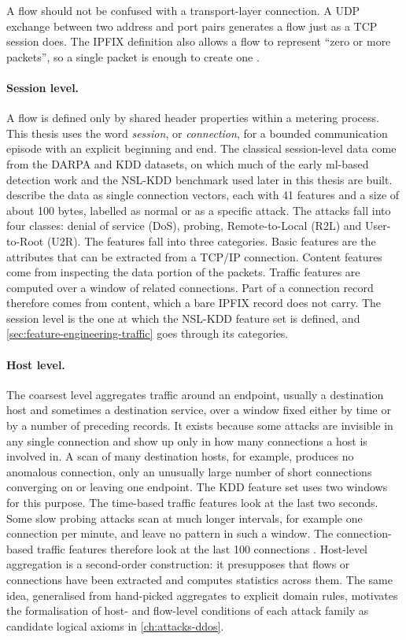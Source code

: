 A flow should not be confused with a transport-layer connection. A UDP
exchange between two address and port pairs generates a flow just as a TCP
session does. The IPFIX definition also allows a flow to represent ``zero or
more packets'', so a single packet is enough to create one
\citep{claise2013rfc7011,sperotto2010flowbased}.

\paragraph{Session level.}
A flow is defined only by shared header properties within a metering
process. This thesis uses the word \emph{session}, or \emph{connection}, for
a bounded communication episode with an explicit beginning and end. The
classical session-level data come from the DARPA and KDD datasets, on which
much of the early \gls{ml}-based detection work and the NSL-KDD benchmark
used later in this thesis are built. \citet{tavallaee2009kddcup99} describe
the data as single connection vectors, each with 41 features and a size of
about 100 bytes, labelled as normal or as a specific attack. The attacks
fall into four classes: denial of service (DoS), probing, Remote-to-Local
(R2L) and User-to-Root (U2R). The features fall into three categories. Basic
features are the attributes that can be extracted from a TCP/IP connection.
Content features come from
inspecting the data portion of the packets. Traffic features are computed
over a window of related connections. Part of a connection record therefore
comes from content, which a bare IPFIX record does not carry. The session
level is the one at which the NSL-KDD feature set is defined, and
\cref{sec:feature-engineering-traffic} goes through its categories.

\paragraph{Host level.}
The coarsest level aggregates traffic around an endpoint, usually a
destination host and sometimes a destination service, over a window fixed
either by time or by a number of preceding records. It exists because some
attacks are invisible in any single connection and show up only in how many
connections a host is involved in. A scan of many destination hosts, for
example, produces no anomalous connection, only an unusually large number of
short connections converging on or leaving one endpoint. The KDD feature set
uses two windows for this purpose. The time-based traffic features look at
the last two seconds. Some slow probing attacks scan at much longer
intervals, for example one connection per minute, and leave no pattern in
such a window. The connection-based traffic features therefore look at the
last 100 connections \citep{tavallaee2009kddcup99}. Host-level aggregation is a second-order construction: it presupposes
that flows or connections have been extracted and computes statistics across
them. The same idea, generalised from hand-picked aggregates to explicit
domain rules, motivates the formalisation of host- and flow-level conditions
of each attack family as candidate logical axioms in
\cref{ch:attacks-ddos}.

